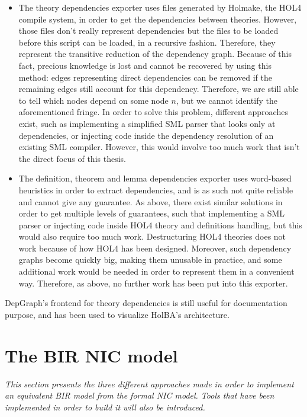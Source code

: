 \documentclass[10pt,a4paper]{article}
\begin{document}
\begin{multicols}{2}
\begin{itemize}
	\item The theory dependencies exporter uses files generated by Holmake, the HOL4 compile system, in order to get the dependencies between theories. However, those files don't really represent dependencies but the files to be loaded before this script can be loaded, in a recursive fashion. Therefore, they represent the transitive reduction of the dependency graph. Because of this fact, precious knowledge is lost and cannot be recovered by using this method: edges representing direct dependencies can be removed if the remaining edges still account for this dependency. Therefore, we are still able to tell which nodes depend on some node $n$, but we cannot identify the aforementioned fringe. In order to solve this problem, different approaches exist, such as implementing a simplified SML parser that looks only at dependencies, or injecting code inside the dependency resolution of an existing SML compiler. However, this would involve too much work that isn't the direct focus of this thesis.
	\item The definition, theorem and lemma dependencies exporter uses word-based heuristics in order to extract dependencies, and is as such not quite reliable and cannot give any guarantee. As above, there exist similar solutions in order to get multiple levels of guarantees, such that implementing a SML parser or injecting code inside HOL4 theory and definitions handling, but this would also require too much work. Destructuring HOL4 theories does not work because of how HOL4 has been designed. Moreover, such dependency graphs become quickly big, making them unusable in practice, and some additional work would be needed in order to represent them in a convenient way. Therefore, as above, no further work has been put into this exporter.
\end{itemize}

\noindent DepGraph's frontend for theory dependencies is still useful for documentation purpose, and has been used to visualize HolBA's architecture.

\section{The BIR NIC model} \label{nic-model}
\textit{This section presents the three different approaches made in order to implement an equivalent BIR model from the formal NIC model. Tools that have been implemented in order to build it will also be introduced.}
\medskip


\end{multicols}
\end{document}
